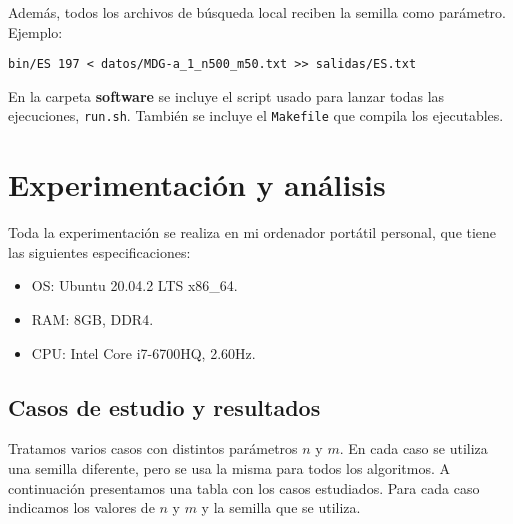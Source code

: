 \documentclass{article}
\begin{document}
Además, todos los archivos de búsqueda local reciben la semilla como parámetro. Ejemplo:
\begin{verbatim}
bin/ES 197 < datos/MDG-a_1_n500_m50.txt >> salidas/ES.txt
\end{verbatim}

En la carpeta \textbf{software} se incluye el script usado para lanzar todas las ejecuciones, \texttt{run.sh}. También se incluye
el \texttt{Makefile} que compila los ejecutables.

\pagebreak

\section{Experimentación y análisis}

Toda la experimentación se realiza en mi ordenador portátil personal, que tiene las siguientes especificaciones:
\begin{itemize}
	\item OS: Ubuntu 20.04.2 LTS x86\_64.
	\item RAM: 8GB, DDR4.
	\item CPU: Intel Core i7-6700HQ, 2.60Hz.
\end{itemize}

\subsection{Casos de estudio y resultados}

Tratamos varios casos con distintos parámetros $n$ y $m$. En cada caso se utiliza una semilla diferente, pero se usa la misma para todos los algoritmos.
A continuación presentamos una tabla con los casos estudiados. Para cada caso indicamos los valores de $n$ y $m$ y la semilla
que se utiliza.
\end{document}
